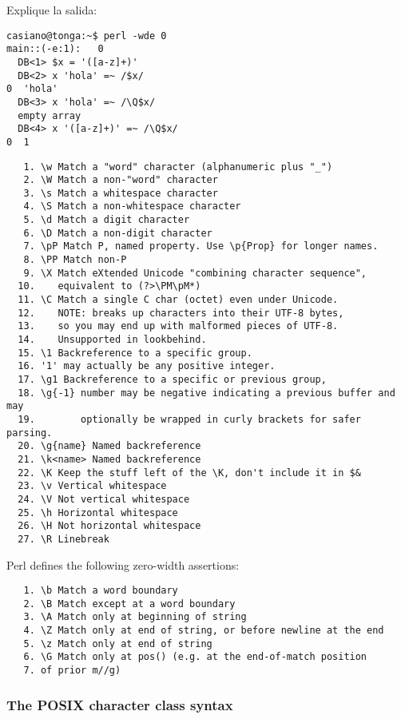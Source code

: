 \begin{exercise}
Explique la salida:
\begin{verbatim}
casiano@tonga:~$ perl -wde 0
main::(-e:1):   0
  DB<1> $x = '([a-z]+)'
  DB<2> x 'hola' =~ /$x/
0  'hola'
  DB<3> x 'hola' =~ /\Q$x/
  empty array
  DB<4> x '([a-z]+)' =~ /\Q$x/
0  1
\end{verbatim}
\end{exercise}


\begin{verbatim}
   1. \w Match a "word" character (alphanumeric plus "_")
   2. \W Match a non-"word" character
   3. \s Match a whitespace character
   4. \S Match a non-whitespace character
   5. \d Match a digit character
   6. \D Match a non-digit character
   7. \pP Match P, named property. Use \p{Prop} for longer names.
   8. \PP Match non-P
   9. \X Match eXtended Unicode "combining character sequence",
  10.    equivalent to (?>\PM\pM*)
  11. \C Match a single C char (octet) even under Unicode.
  12.    NOTE: breaks up characters into their UTF-8 bytes,
  13.    so you may end up with malformed pieces of UTF-8.
  14.    Unsupported in lookbehind.
  15. \1 Backreference to a specific group.
  16. '1' may actually be any positive integer.
  17. \g1 Backreference to a specific or previous group,
  18. \g{-1} number may be negative indicating a previous buffer and may
  19.        optionally be wrapped in curly brackets for safer parsing.
  20. \g{name} Named backreference
  21. \k<name> Named backreference
  22. \K Keep the stuff left of the \K, don't include it in $&
  23. \v Vertical whitespace
  24. \V Not vertical whitespace
  25. \h Horizontal whitespace
  26. \H Not horizontal whitespace
  27. \R Linebreak
\end{verbatim}


Perl defines the following zero-width assertions:

\begin{verbatim}
   1. \b Match a word boundary
   2. \B Match except at a word boundary
   3. \A Match only at beginning of string
   4. \Z Match only at end of string, or before newline at the end
   5. \z Match only at end of string
   6. \G Match only at pos() (e.g. at the end-of-match position
   7. of prior m//g)
\end{verbatim}


\subsubsection{The POSIX character class syntax}

